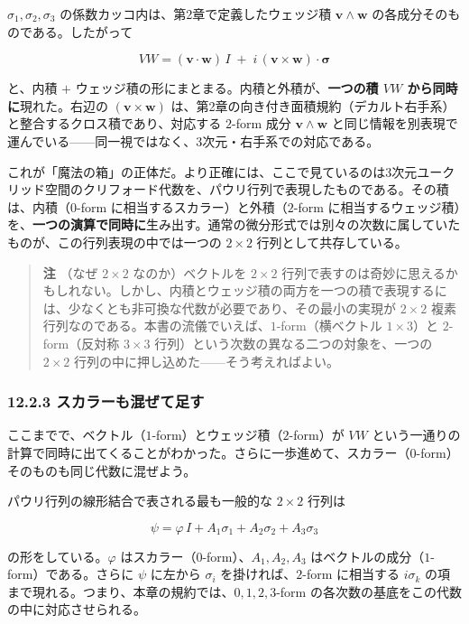 \documentclass[a4paper,12pt,openany]{book}
\begin{document}
\(\sigma_1,\sigma_2,\sigma_3\)
の係数カッコ内は、第2章で定義したウェッジ積
\(\mathbf{v}\wedge\mathbf{w}\) の各成分そのものである。したがって

\[VW = (\mathbf{v}\!\cdot\!\mathbf{w})\,I \;+\; i\,(\mathbf{v}\times\mathbf{w})\!\cdot\!\bm{\sigma}\]

と、内積 \(+\)
ウェッジ積の形にまとまる。内積と外積が、\textbf{一つの積 $VW$ から同時に}現れた。右辺の
\((\mathbf{v}\times\mathbf{w})\)
は、第2章の向き付き面積規約（デカルト右手系）と整合するクロス積であり、対応する
\(2\)-form 成分 \(\mathbf{v}\wedge\mathbf{w}\)
と同じ情報を別表現で運んでいる——同一視ではなく、3次元・右手系での対応である。

これが「魔法の箱」の正体だ。より正確には、ここで見ているのは3次元ユークリッド空間のクリフォード代数を、パウリ行列で表現したものである。その積は、内積（\(0\)-form
に相当するスカラー）と外積（\(2\)-form
に相当するウェッジ積）を、\textbf{一つの演算で同時に}生み出す。通常の微分形式では別々の次数に属していたものが、この行列表現の中では一つの
\(2\times2\) 行列として共存している。

\begin{quote}
\textbf{注} （なぜ \(2\times2\) なのか）ベクトルを \(2\times2\)
行列で表すのは奇妙に思えるかもしれない。しかし、内積とウェッジ積の両方を一つの積で表現するには、少なくとも非可換な代数が必要であり、その最小の実現が
\(2\times2\)
複素行列なのである。本書の流儀でいえば、\(1\)-form（横ベクトル
\(1\times3\)）と \(2\)-form（反対称 \(3\times3\)
行列）という次数の異なる二つの対象を、一つの \(2\times2\)
行列の中に押し込めた——そう考えればよい。
\end{quote}

\hypertarget{ux30b9ux30abux30e9ux30fcux3082ux6df7ux305cux3066ux8db3ux3059}{%
\subsubsection{12.2.3
スカラーも混ぜて足す}\label{ux30b9ux30abux30e9ux30fcux3082ux6df7ux305cux3066ux8db3ux3059}}

ここまでで、ベクトル（\(1\)-form）とウェッジ積（\(2\)-form）が \(VW\)
という一通りの計算で同時に出てくることがわかった。さらに一歩進めて、スカラー（\(0\)-form）そのものも同じ代数に混ぜよう。

パウリ行列の線形結合で表される最も一般的な \(2\times2\) 行列は

\[\psi = \varphi\,I + A_1\sigma_1 + A_2\sigma_2 + A_3\sigma_3\]

の形をしている。\(\varphi\) はスカラー（\(0\)-form）、\(A_1,A_2,A_3\)
はベクトルの成分（\(1\)-form）である。さらに \(\psi\) に左から
\(\sigma_i\) を掛ければ、\(2\)-form に相当する \(i\sigma_k\)
の項まで現れる。つまり、本章の規約では、\(0,1,2,3\)-form
の各次数の基底をこの代数の中に対応させられる。
\end{document}
